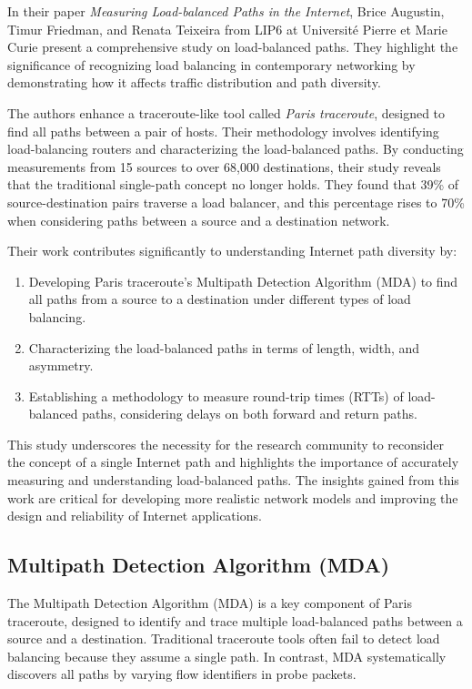 \documentclass[12pt]{cwru_thesis}
\begin{document}
In their paper \textit{Measuring Load-balanced Paths in the Internet}, Brice Augustin, Timur Friedman, and Renata Teixeira from LIP6 at Université Pierre et Marie Curie present a comprehensive study on load-balanced paths. They highlight the significance of recognizing load balancing in contemporary networking by demonstrating how it affects traffic distribution and path diversity.

The authors enhance a traceroute-like tool called \textit{Paris traceroute}, designed to find all paths between a pair of hosts. Their methodology involves identifying load-balancing routers and characterizing the load-balanced paths. By conducting measurements from 15 sources to over 68,000 destinations, their study reveals that the traditional single-path concept no longer holds. They found that 39\% of source-destination pairs traverse a load balancer, and this percentage rises to 70\% when considering paths between a source and a destination network.

Their work contributes significantly to understanding Internet path diversity by:
\begin{enumerate}
    \item Developing Paris traceroute’s Multipath Detection Algorithm (MDA) to find all paths from a source to a destination under different types of load balancing.
    \item Characterizing the load-balanced paths in terms of length, width, and asymmetry.
    \item Establishing a methodology to measure round-trip times (RTTs) of load-balanced paths, considering delays on both forward and return paths.
\end{enumerate}

This study underscores the necessity for the research community to reconsider the concept of a single Internet path and highlights the importance of accurately measuring and understanding load-balanced paths. The insights gained from this work are critical for developing more realistic network models and improving the design and reliability of Internet applications.

\subsection{Multipath Detection Algorithm (MDA)}

The Multipath Detection Algorithm (MDA) is a key component of Paris traceroute, designed to identify and trace multiple load-balanced paths between a source and a destination. Traditional traceroute tools often fail to detect load balancing because they assume a single path. In contrast, MDA systematically discovers all paths by varying flow identifiers in probe packets.
\end{document}
